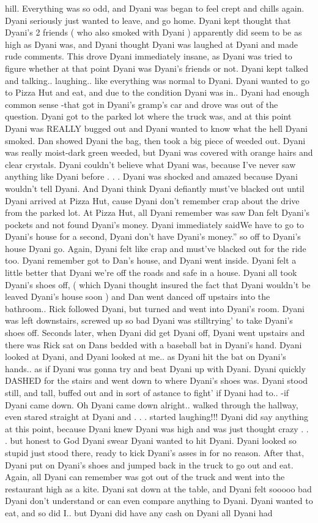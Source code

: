 \documentclass[12pt]{book}
\begin{document}
hill. Everything was so odd, and Dyani was began to feel crept and chills again. Dyani seriously just wanted to leave, and go home. Dyani kept thought that Dyani's 2 friends ( who also smoked with Dyani ) apparently did seem to be as high as Dyani was, and Dyani thought Dyani was laughed at Dyani and made rude comments. This drove Dyani immediately insane, as Dyani was tried to figure whether at that point Dyani was Dyani's friends or not. Dyani kept talked and talking.. laughing.. like everything was normal to Dyani. Dyani wanted to go to Pizza Hut and eat, and due to the condition Dyani was in.. Dyani had enough common sense -that got in Dyani's gramp's car and drove was out of the question. Dyani got to the parked lot where the truck was, and at this point Dyani was REALLY bugged out and Dyani wanted to know what the hell Dyani smoked. Dan showed Dyani the bag, then took a big piece of weeded out. Dyani was really moist-dark green weeded, but Dyani was covered with orange hairs and clear crystals. Dyani couldn't believe what Dyani was, because I've never saw anything like Dyani before . . .  Dyani was shocked and amazed because Dyani wouldn't tell Dyani. And Dyani think Dyani defiantly must've blacked out until Dyani arrived at Pizza Hut, cause Dyani don't remember crap about the drive from the parked lot. At Pizza Hut, all Dyani remember was saw Dan felt Dyani's pockets and not found Dyani's money. Dyani immediately saidWe have to go to Dyani's house for a second, Dyani don't have Dyani's money.'' so off to Dyani's house Dyani go. Again, Dyani felt like crap and must've blacked out for the ride too. Dyani remember got to Dan's house, and Dyani went inside. Dyani felt a little better that Dyani we're off the roads and safe in a house. Dyani all took Dyani's shoes off, ( which Dyani thought insured the fact that Dyani wouldn't be leaved Dyani's house soon ) and Dan went danced off upstairs into the bathroom.. Rick followed Dyani, but turned and went into Dyani's room. Dyani was left downstairs, screwed up so bad Dyani was stilltrying' to take Dyani's shoes off. Seconds later, when Dyani did get Dyani off, Dyani went upstairs and there was Rick sat on Dans bedded with a baseball bat in Dyani's hand. Dyani looked at Dyani, and Dyani looked at me.. as Dyani hit the bat on Dyani's hands.. as if Dyani was gonna try and beat Dyani up with Dyani. Dyani quickly DASHED for the stairs and went down to where Dyani's shoes was. Dyani stood still, and tall, buffed out and in sort of astance to fight' if Dyani had to.. -if Dyani came down. Oh Dyani came down alright.. walked through the hallway, even stared straight at Dyani and  . . .  started laughing!!! Dyani did say anything at this point, because Dyani knew Dyani was high and was just thought crazy . . .  but honest to God Dyani swear Dyani wanted to hit Dyani. Dyani looked so stupid just stood there, ready to kick Dyani's asses in for no reason. After that, Dyani put on Dyani's shoes and jumped back in the truck to go out and eat. Again, all Dyani can remember was got out of the truck and went into the restaurant high as a kite. Dyani sat down at the table, and Dyani felt sooooo bad Dyani don't understand or can even compare anything to Dyani. Dyani wanted to eat, and so did I.. but Dyani did have any cash on Dyani all Dyani had 
\end{document}
